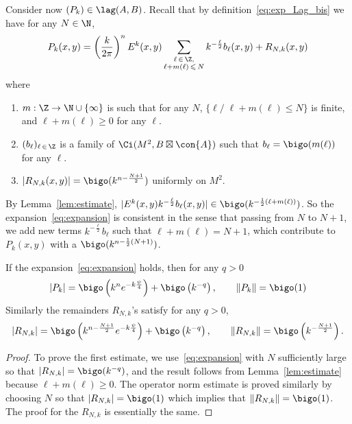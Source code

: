 Consider now $(P_k) \in \lag (A,B)$. Recall that by definition~\eqref{eq:exp_Lag_bis} we have for any $N \in \N$, 
\begin{gather}\label{eq:expansion}
P_k (x,y) = \left(\frac{k}{2\pi} \right)^n E^k(x,y) \sum_{\substack{\ell\,\in\,\Z, \\
\ell + m (\ell)\,\leqslant\,N }} k^{- \frac{\ell}{2}} b_{\ell} (x,y) + R_{N,k} (x,y)
\end{gather}
where
\begin{enumerate}\romanenumi
\item $m : \Z \rightarrow \N \cup \{\infty \} $ is such that for any $N$, $\{ \ell/\; \ell + m(\ell) \leqslant N \}$ is finite, and $\ell + m (
\ell) \geqslant 0$ for any $\ell$.
\item $(b_{\ell})_{\ell\,\in\,\Z}$ is a family of $\Ci (M^2, B \boxtimes \con{A})$ such that $b _{\ell} = \bigo (m(
\ell))$ for any $\ell$.
\item $|R_{N,k} (x,y) | = \bigo (k^{n - \frac{N+1}{2}})$ uniformly on $M^2$.
\end{enumerate}
By Lemma~\ref{lem:estimate}, $| E^k(x,y) k^{-\frac{\ell}{ 2}} b_{\ell}(x,y) | \in \bigo (k^{ - \frac{1}{2} (\ell + m (\ell))})$. So the expansion~\eqref{eq:expansion} is consistent in the sense that passing from $N$ to $N+1$, we add new terms $k^{-\frac{\ell}{2}} b_\ell$ such that $\ell + m (\ell) = N+1$, which contribute to $P_k (x,y)$ with a $\bigo (k^{n -\frac{1}{2}(N+1)})$.

\begin{lemm}\label{lem:estim_expansion}
If the expansion~\eqref{eq:expansion} holds, then for any $q>0$
\[
|P_k | = \bigo \left(k^{n} e^{- k
\frac{\psi }{4}} \right) + \bigo \left(k^{-q}\right),  \qquad \| P_k \| = \bigo (1)
\]
Similarly the remainders $R_{N,k}$'s satisfy for any $q>0$,
\[
 |R_{N,k} | = \bigo \left(k^{n- \frac{N+1}{2}} e^{- k
\frac{\psi }{4}} \right) + \bigo\left(k^{-q}\right),  \qquad \| R_{N,k} \| = \bigo
\left(k^{-\frac{N+1}{2}}\right).
\]
\end{lemm}

\begin{proof}
To prove the first estimate, we use~\eqref{eq:expansion} with $N$ sufficiently large so that $| R_{N,k} | = \bigo (k^{-q})$, and the result follows from Lemma~\ref{lem:estimate} because $\ell + m (\ell) \geqslant 0$. The operator norm estimate is proved similarly by choosing $N$ so that $|R_{N,k} | =\bigo (1)$ which implies that $\| R_{N,k} \| = \bigo (1)$. The proof for the $R_{N,k}$ is essentially the same.
\end{proof}

